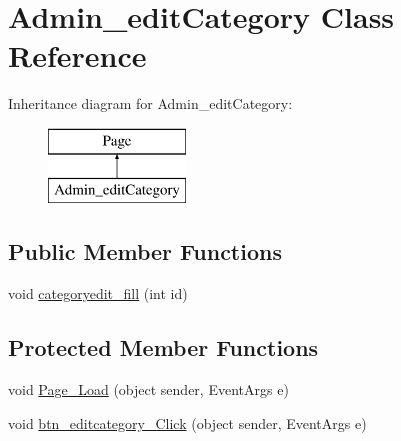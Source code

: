 \hypertarget{class_admin__edit_category}{}\section{Admin\+\_\+edit\+Category Class Reference}
\label{class_admin__edit_category}
Inheritance diagram for Admin\+\_\+edit\+Category\+:\begin{figure}[H]
\begin{center}
\leavevmode
\includegraphics[height=2.000000cm]{class_admin__edit_category}
\end{center}
\end{figure}
\subsection*{Public Member Functions}
\begin{DoxyCompactItemize}
\item 
void \mbox{\hyperlink{class_admin__edit_category_a52f7157762311608937ec44d695cc7e6}{categoryedit\+\_\+fill}} (int id)
\end{DoxyCompactItemize}
\subsection*{Protected Member Functions}
\begin{DoxyCompactItemize}
\item 
void \mbox{\hyperlink{class_admin__edit_category_a22f299dd79f307aca3187adf1eb4df9b}{Page\+\_\+\+Load}} (object sender, Event\+Args e)
\item 
void \mbox{\hyperlink{class_admin__edit_category_a50bc9769596f9e6b98d1ed879a5d4fbc}{btn\+\_\+editcategory\+\_\+\+Click}} (object sender, Event\+Args e)
\end{DoxyCompactItemize}
